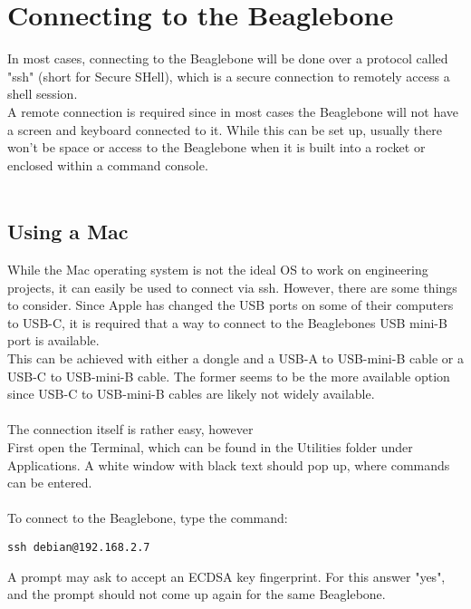 \documentclass[12pt,article]{memoir}
\begin{document}
\newpage
\section{Connecting to the Beaglebone}
In most cases, connecting to the Beaglebone will be done over a protocol called "ssh" (short for Secure SHell), which is a secure connection to remotely access a shell session.\\

\noindent
A remote connection is required since in most cases the Beaglebone will not have a screen and keyboard connected to it. While this can be set up, usually there won’t be space or access to the Beaglebone when it is built into a rocket or enclosed within a command console.\\\\

\subsection{Using a Mac}
While the Mac operating system is not the ideal OS  to work on engineering projects, it can easily be used to connect via ssh. However, there are some things to consider. Since Apple has changed the USB ports on some of their computers to USB-C, it is required that a way to connect to the Beaglebones USB mini-B port is available.\\
This can be achieved with either a dongle and a USB-A to USB-mini-B cable or a USB-C to USB-mini-B cable. The former seems to be the more available option since USB-C to USB-mini-B cables are likely not widely available.\\\\

\noindent
The connection itself is rather easy, however\\
First open the Terminal, which can be found in the Utilities folder under Applications. A white window with black text should pop up, where commands can be entered.\\\\
\noindent
To connect to the Beaglebone, type the command:\\

\begin{lstlisting}
ssh debian@192.168.2.7
\end{lstlisting}

\noindent
A prompt may ask to accept an ECDSA key fingerprint. For this answer "yes", and the prompt should not come up again for the same Beaglebone.\\
\end{document}
